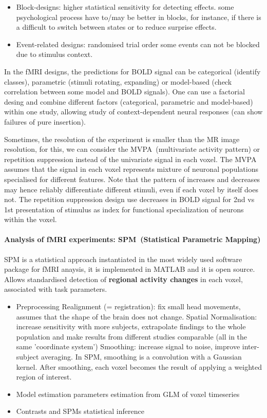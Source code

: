 \documentclass[12pt,article,oneside,a4paper]{memoir}
\begin{document}
\begin{itemize}
\item Block-designs:
\subitem higher statistical sensitivity for detecting effects.
\subitem some psychological process have to/may be better in blocks, for
instance, if there is a difficult to switch between states or to reduce surprise
effects.
\item Event-related designs:
\subitem randomised trial order
\subitem some events can not be blocked due to stimulus context.
\end{itemize}

In the fMRI designs, the predictions for BOLD signal can be categorical
(identify classes), parametric (stimuli rotating, expanding) or model-based
(check correlation between some model and BOLD signals). One can use a
factorial desing and combine different factors (categorical, parametric and
model-based) within one study, allowing study of context-dependent neural
responses (can show failures of pure insertion).

Sometimes, the resolution of the experiment is smaller than the MR image
resolution, for this, we can consider the MVPA~(multivariate activity pattern)
or repetition suppression instead of the univariate signal in each voxel. The
MVPA assumes that the signal in each voxel represents mixture of neuronal
populations specialised for different features. Note that the pattern of
increases and decreases may hence reliably differentiate different stimuli,
even if each voxel by itself does not. The repetition suppression design use
decreases in BOLD signal for 2nd vs 1st presentation of stimulus as index for
functional specialization of neurons within the voxel.

\paragraph{Analysis of fMRI experiments: SPM~(Statistical Parametric Mapping)}
SPM is a statistical approach instantiated in the most widely used software
package for fMRI anaysis, it is implemented in MATLAB and it is open source.
Allows standardised detection of \textbf{regional activity changes} in each
voxel, associated with task parameters.

\begin{itemize}
\item Preprocessing
\subitem Realignment (= registration): fix small head movements, assumes that
the shape of the brain does not change.
\subitem Spatial Normalisation: increase sensitivity with more subjects,
extrapolate findings to the whole population and make results from different
studies comparable (all in the same 'coordinate system')
\subitem Smoothing: increase signal to noise, improve inter-subject averaging.
In SPM, smoothing is a convolution with a Gaussian kernel. After smoothing,
each voxel becomes the result of applying a weighted region of interest.
\item Model estimation
\subitem parameters estimation from GLM of voxel timeseries
\item Contrasts and SPMs
\subitem statistical inference
\end{itemize}
\end{document}
